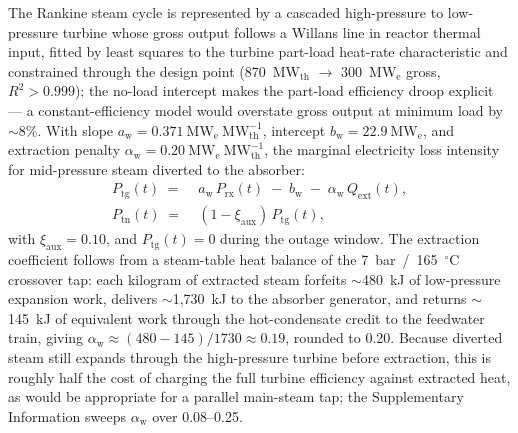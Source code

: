 \documentclass[sn-vancouver,Numbered]{sn-jnl}%
\begin{document}
The Rankine steam cycle is represented by a cascaded high-pressure to low-pressure turbine whose gross output follows a Willans line in reactor thermal input, fitted by least squares to the turbine part-load heat-rate characteristic and constrained through the design point (870~MW$_\mathrm{th}$ $\rightarrow$ 300~MW$_\mathrm{e}$ gross, $R^2>0.999$); the no-load intercept makes the part-load efficiency droop explicit — a constant-efficiency model would overstate gross output at minimum load by $\sim$8\%. With slope $a_{\mathrm{w}}=0.371~\mathrm{MW}_{\mathrm{e}}~\mathrm{MW}_{\mathrm{th}}^{-1}$, intercept $b_{\mathrm{w}}=22.9~\mathrm{MW}_{\mathrm{e}}$, and extraction penalty $\alpha_{\mathrm{w}}=0.20~\mathrm{MW}_{\mathrm{e}}~\mathrm{MW}_{\mathrm{th}}^{-1}$, the marginal electricity loss intensity for mid-pressure steam diverted to the absorber:
\begin{align}
P_{\mathrm{tg}}(t) \;=\; & a_{\mathrm{w}}\, P_{\mathrm{rx}}(t) \;-\; b_{\mathrm{w}} \;-\; \alpha_{\mathrm{w}}\, Q_{\mathrm{ext}}(t), \label{eq:turb_willans}\\
P_{\mathrm{tn}}(t) \;=\; & (1 - \xi_{\mathrm{aux}})\, P_{\mathrm{tg}}(t), \label{eq:turb_aux}
\end{align}
with $\xi_{\mathrm{aux}}=0.10$, and $P_{\mathrm{tg}}(t)=0$ during the outage window. The extraction coefficient follows from a steam-table heat balance of the 7~bar~/~165~$^\circ$C crossover tap: each kilogram of extracted steam forfeits $\sim$480~kJ of low-pressure expansion work, delivers $\sim$1{,}730~kJ to the absorber generator, and returns $\sim$145~kJ of equivalent work through the hot-condensate credit to the feedwater train, giving $\alpha_{\mathrm{w}} \approx (480-145)/1730 \approx 0.19$, rounded to 0.20. Because diverted steam still expands through the high-pressure turbine before extraction, this is roughly half the cost of charging the full turbine efficiency against extracted heat, as would be appropriate for a parallel main-steam tap; the Supplementary Information sweeps $\alpha_{\mathrm{w}}$ over 0.08--0.25.
\end{document}
